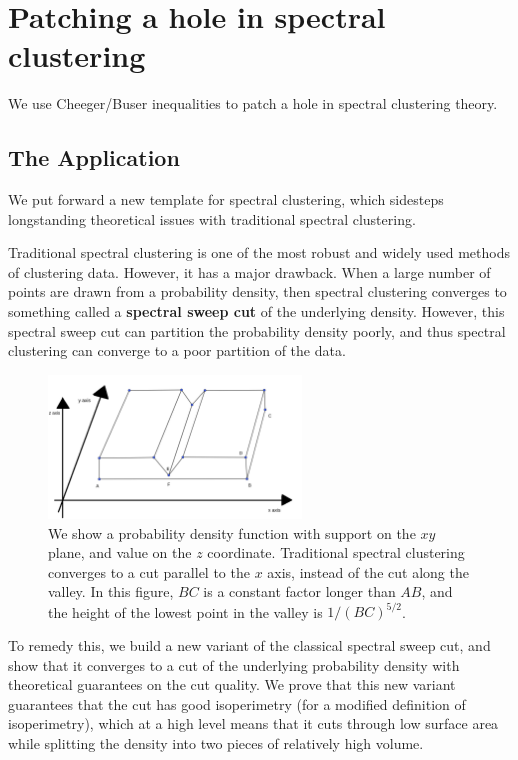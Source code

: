 \section{Patching a hole in spectral clustering}
We use Cheeger/Buser inequalities to patch a hole in spectral
clustering theory.
\subsection{The Application}
We put forward a new template for spectral clustering, which sidesteps
longstanding theoretical issues with traditional spectral clustering.

Traditional spectral clustering is one of the most robust and widely
used methods of clustering data. However, it has a major drawback. When a large number of points are drawn from a probability
density, then spectral clustering converges to something called a
\textbf{spectral sweep cut} of the underlying density.  However, this
spectral sweep cut can partition the probability density poorly, and
thus spectral clustering can converge to a poor partition of the data.

\begin{figure}[htbp]
\centering
\includegraphics[width=0.6\textwidth]{images/counterexample.png}
\caption{
  We show a probability density function with support on the $xy$ plane,
  and value on the $z$ coordinate.  Traditional spectral clustering converges to a cut
  parallel to the $x$ axis, instead of the cut along the valley.
    In this figure,
  $BC$ is a constant
  factor longer than $AB$, and the height of the lowest point in the
  valley is
  $1/(BC)^{5/2}$. 
 }
\label{fig:spec}
\end{figure}

To remedy this, we build a new variant of the classical spectral sweep
cut, and show that it converges to a cut of the underlying probability
density with theoretical guarantees on the cut quality. We prove that
this new variant guarantees that the cut has good isoperimetry (for a
    modified definition of isoperimetry), which at a high level means
that it cuts through low surface area while splitting the density into
two pieces of relatively high volume.

